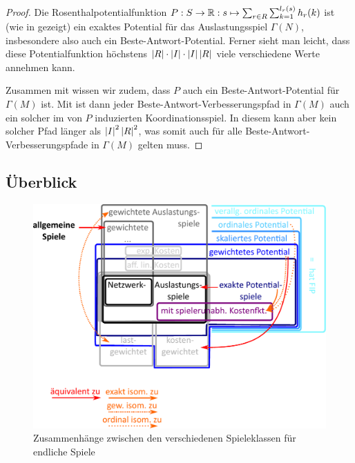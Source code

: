 \begin{proof}
	Die Rosenthalpotentialfunktion $P: S \to \mathbb{R}: s \mapsto \sum_{r \in R}\sum_{k=1}^{l_r(s)} h_r(k)$ ist (wie in  gezeigt) ein exaktes Potential für das Auslastungsspiel $\Gamma(N)$, insbesondere also auch ein Beste-Antwort-Potential. Ferner sieht man leicht, dass diese Potentialfunktion höchstens $\left|R\right|\cdot\left|I\right|\cdot \left|I\right|\left|R\right|$ viele verschiedene Werte annehmen kann.
	
	Zusammen mit  wissen wir zudem, dass $P$ auch ein Beste-Antwort-Potential für $\Gamma(M)$ ist. Mit  ist dann jeder Beste-Antwort-Verbesserungspfad in $\Gamma(M)$ auch ein solcher im von $P$ induzierten Koordinationsspiel. In diesem kann aber kein solcher Pfad länger als $\left|I\right|^2\left|R\right|^2$, was somit auch für alle Beste-Antwort-Verbesserungspfade in $\Gamma(M)$ gelten muss.
\end{proof}


\subsection{Überblick}

\begin{figure}[h]\centering
	\includegraphics[width=.7\textwidth]{../Bilder/EulerDiagramm.pdf}
	\caption{Zusammenhänge zwischen den verschiedenen Spieleklassen für endliche Spiele}
\end{figure}